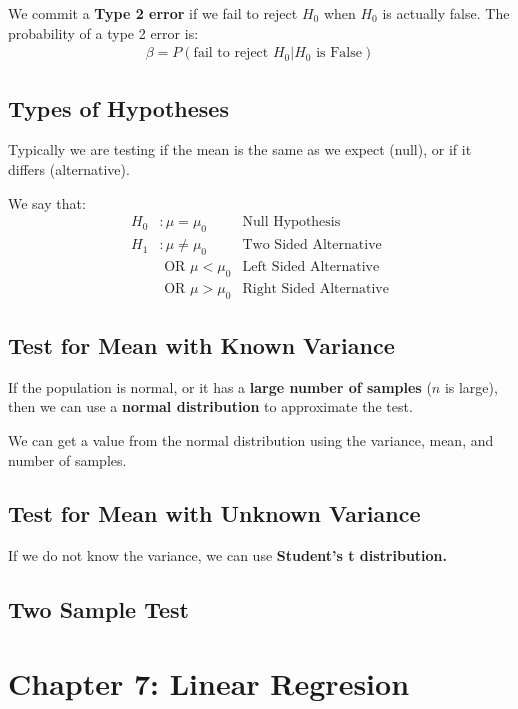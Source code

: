 \documentclass[12pt,letterpaper]{article} \usepackage{amsmath} \usepackage{graphicx} \usepackage[margin=1in]{geometry} \usepackage{longtable}  \usepackage{amssymb}
\begin{document}
	We commit a \textbf{Type 2 error} if we fail to reject $H_0$ when $H_0$ is actually false. The probability of a type 2 error is:
	\begin{align*}
		\beta= P(\text{fail to reject }H_0| H_0 \text{ is False})
	\end{align*}
	
	\subsection{Types of Hypotheses}
	Typically we are testing if the mean is the same as we expect (null), or if it differs (alternative).
	
	We say that:
	\begin{align*}
		H_0&: \mu = \mu_0 &\text{Null Hypothesis}\\
		H_1&: \mu \ne \mu_0 &\text{Two Sided Alternative}\\ 
		&\text{ OR } \mu<\mu_0 &\text{Left Sided Alternative}\\
		&\text{ OR } \mu>\mu_0 &\text{Right Sided Alternative}
	\end{align*}
	
	\subsection{Test for Mean with Known Variance}
	If the population is normal, or it has a \textbf{large number of samples} ($n$ is large), then we can use a \textbf{normal distribution} to approximate the test. 
	
	We can get a value from the normal distribution using the variance, mean, and number of samples. 
	
	\subsection{Test for Mean with Unknown Variance}
	If we do not know the variance, we can use \textbf{Student's t distribution.}
	
	\subsection{Two Sample Test}
	
	\section{Chapter 7: Linear Regresion}
	
\end{document}
